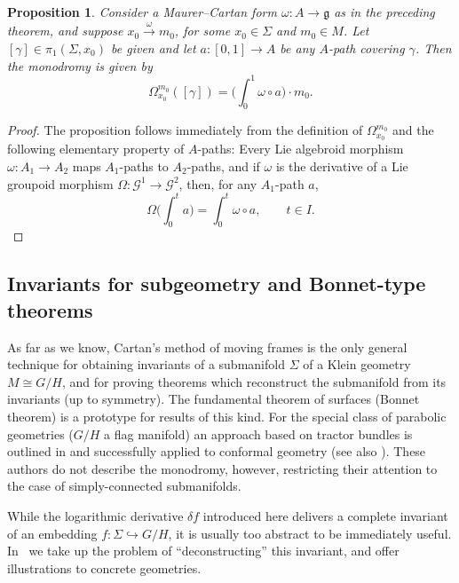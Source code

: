 \documentclass[pdftex]{sigma}%
\numberwithin{equation}{section}
\newtheorem{Proposition}[Theorem]{Proposition}
\newcommand\integral{\int}
\begin{document}
\begin{Proposition}%
Consider a Maurer--Cartan form $\omega \colon A
 \rightarrow {\mathfrak g} $ as in the preceding theorem, and suppose
 $x_0\xrightarrow{\omega}m_0$, for some $x_0 \in \Sigma $ and
 $m_0 \in M$. Let $[\gamma] \in \pi_1(\Sigma,x_0)$ be given and let
 $a \colon [0,1]\rightarrow A$ be {\em any} $A$-path covering
 $\gamma $. Then the monodromy is given by
 \[
 \Omega_{x_0}^{m_0}([\gamma])=\bigg(\integral_0^1 \omega \circ a\bigg)\cdot m_0.
\]
\end{Proposition}
%
\begin{proof} The proposition follows immediately from the definition
of $\Omega_{x_0}^{m_0}$ and the following ele\-mentary property of
$A$-paths: Every Lie algebroid morphism $\omega \colon A_1 \rightarrow
A_2$ maps $A_1$-paths to $A_2$-paths, and if $\omega $ is the
derivative of a Lie groupoid morphism $\Omega \colon {\mathcal G}^1
\rightarrow {\mathcal G}^2$, then, for any $A_1$-path $a$,
 \begin{equation*}
 \Omega \bigg(\integral_0^t a\bigg) =
\integral_0^t \omega \circ a, \qquad t \in I.\tag*{\qed}
 \end{equation*}\renewcommand{\qed}{}
\end{proof}

\subsection*{Invariants for subgeometry and Bonnet-type theorems} As
far as we know, Cartan's method of moving frames is the only general
technique for obtaining invariants of a submanifold $\Sigma $ of a
Klein geometry $M \cong G/H$, and for proving theorems which
reconstruct the submanifold from its invariants (up to symmetry). The
fundamental theorem of surfaces (Bonnet theorem) is a prototype for
results of this kind. For the special class of parabolic geometries
($G/H$ a flag manifold) an approach based on tractor bundles is
outlined in \cite{Burstall_Calderbank_04} and successfully applied to
conformal geometry (see also \cite{Burstall_Calderbank_10}). These
authors do not describe the monodromy, however, restricting their
attention to the case of simply-connected submanifolds.

While the logarithmic derivative $\delta f$ introduced here delivers a
complete invariant of an embedding $f \colon \Sigma \hookrightarrow
G/H$, it is usually too abstract to be immediately useful. In~\cite{Blaom_G} we take up the problem of ``deconstructing'' this
invariant, and offer illustrations to concrete geometries.
\end{document}
